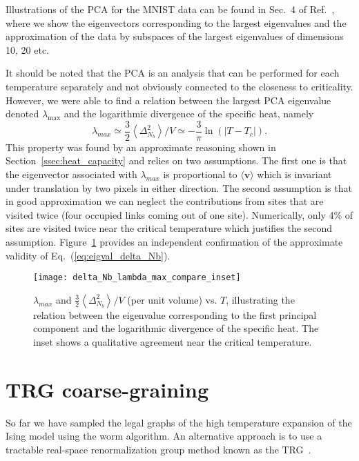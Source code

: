 \documentclass[../main.tex]{subfiles}
\begin{document}
Illustrations of the PCA for the MNIST data can be found in Sec.~4 of
Ref.~\cite{foreman2017}, where we show the eigenvectors corresponding to the
largest eigenvalues and the approximation of the data by subspaces of the
largest eigenvalues of dimensions 10, 20 etc. 

It should be noted that the PCA is an analysis that can be performed for each
temperature separately and not obviously connected to the closeness to
criticality. However, we were able to find a relation between the largest PCA
eigenvalue denoted $\lambda_{\max}$ and the logarithmic divergence of the
specific heat, namely
%
\begin{equation}
    \lambda_{max} \simeq \frac{3}{2}\left \langle \Delta_{N_b}^2
    \right\rangle/V\simeq -\frac{3}{\pi}\ln(|T-T_c|).
    \label{eq:eigval_delta_Nb}
\end{equation}
%
This property was found by an approximate reasoning shown in
Section~\ref{ssec:heat_capacity} and relies on two assumptions.  The first one
is that the eigenvector associated with $\lambda_{max}$ is proportional to
$\langle \mathbf{v}\rangle$ which is invariant under translation by two pixels
in either direction. The second assumption is that in good approximation we can
neglect the contributions from sites that are visited twice (four occupied
links coming out of one site).  Numerically, only 4\% of sites are visited
twice near the critical temperature which justifies the second assumption.
Figure~\ref{fig:eigval_fluctuations_unblocked} provides an independent
confirmation of the approximate validity of Eq.~(\ref{eq:eigval_delta_Nb}). 
%
\begin{figure}[htpb]
    \centering
    \texttt{[image: delta\_Nb\_lambda\_max\_compare\_inset]}\hfill
    \caption{$\lambda_{max}$ and $\frac{3}{2}\left \langle \Delta_{N_b}^2
        \right\rangle / V$ (per unit volume) vs. $T$, illustrating the relation
        between the eigenvalue corresponding to the first principal component
        and the logarithmic divergence of the specific heat. The inset shows a
    qualitative agreement near the critical temperature.}%
  \label{fig:eigval_fluctuations_unblocked}
\end{figure}
%
\section{TRG coarse-graining}%
\label{sec:trg}
So far we  have sampled the legal graphs of the high temperature expansion of
the Ising model using the worm algorithm.  An alternative approach is to use a
tractable real-space renormalization group method known as the
TRG~\cite{PhysRevB.86.045139,prb87,prd88,prd89,pre89}. 
\end{document}

